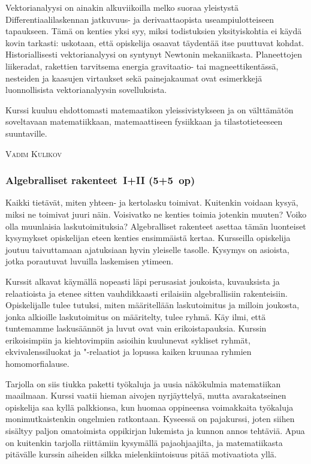 \documentclass[../ala_hataile.tex]{subfiles}
\begin{document}
	Vektorianalyysi on ainakin alkuviikoilla
	melko suoraa yleistystä Differentiaalilaskennan
	jatkuvuus- ja derivaattaopista useampiulotteiseen
	tapaukseen. Tämä on kenties yksi
	syy, miksi todistuksien yksityiskohtia ei
	käydä kovin tarkasti: uskotaan, että opiskelija
	osaavat täydentää itse puuttuvat kohdat.
	Historiallisesti vektorianalyysi on syntynyt
	Newtonin mekaniikasta. Planeettojen
	liikeradat, rakettien tarvitsema energia gravitaatio-
	tai magneettikentässä, nesteiden
	ja kaasujen virtaukset sekä painejakaumat
	ovat esimerkkejä luonnollisista vektorianalyysin
	sovelluksista.
	
	Kurssi kuuluu ehdottomasti matemaatikon
	yleissivistykseen ja on välttämätön soveltavaan
	matematiikkaan, matemaattiseen
	fysiikkaan ja tilastotieteeseen suuntaville.
	
	\vspace{0.5cm}
	\noindent\textsc{Vadim Kulikov}
	
	\subsubsection*{Algebralliset rakenteet~I+II (5+5~op)}
	Kaikki tietävät, miten yhteen- ja kertolasku
	toimivat. Kuitenkin voidaan kysyä,
	miksi ne toimivat juuri näin. Voisivatko ne
	kenties toimia jotenkin muuten? Voiko olla
	muunlaisia laskutoimituksia? Algebralliset
	rakenteet asettaa tämän luonteiset kysymykset
	opiskelijan eteen kenties ensimmäistä
	kertaa. Kursseilla opiskelija joutuu
	taivuttamaan ajatuksiaan hyvin yleiselle
	tasolle. Kysymys on asioista, jotka porautuvat
	luvuilla laskemisen ytimeen.
	
	Kurssit alkavat käymällä nopeasti läpi
	perusasiat joukoista, kuvauksista ja relaatioista
	ja etenee sitten vauhdikkaasti
	erilaisiin algebrallisiin rakenteisiin. Opiskelijalle
	tulee tutuksi, miten määritellään
	laskutoimitus ja milloin joukosta, jonka
	alkioille laskutoimitus on määritelty, tulee
	ryhmä. Käy ilmi, että tuntemamme laskusäännöt
	ja luvut ovat vain erikoistapauksia.
	Kurssin erikoisimpiin ja kiehtovimpiin asioihin
	kuulunevat sykliset ryhmät, ekvivalenssiluokat
	ja "-relaatiot ja lopussa kaiken
	kruunaa ryhmien homomorfialause.
	
	Tarjolla on siis tiukka paketti työkaluja
	ja uusia näkökulmia matematiikan maailmaan.
	Kurssi vaatii hieman aivojen nyrjäyttelyä,
	mutta avarakatseinen opiskelija
	saa kyllä palkkionsa, kun huomaa oppineensa
	voimakkaita työkaluja monimutkaistenkin
	ongelmien ratkontaan. Kyseessä
	on pajakurssi, joten siihen sisältyy paljon
	omatoimista oppikirjan lukemista ja kunnon annos tehtäviä. Apua on kuitenkin tarjolla
	riittämiin kysymällä pajaohjaajilta, ja
	matematiikasta pitävälle kurssin aiheiden
	silkka mielenkiintoisuus pitää motivaatiota
	yllä.
	
\end{document}
